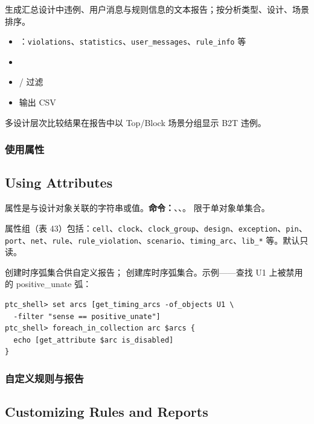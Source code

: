 生成汇总设计中违例、用户消息与规则信息的文本报告；按分析类型、设计、场景排序。

\begin{itemize}
  \item {}：\texttt{violations}、\texttt{statistics}、\texttt{user\_messages}、\texttt{rule\_info} 等
  \item {}
  \item {}/ 过滤
  \item {} 输出 CSV
\end{itemize}

多设计层次比较结果在报告中以 Top/Block 场景分组显示 B2T 违例。

\subsubsection{使用属性}
\subsection*{Using Attributes}

属性是与设计对象关联的字符串或值。\textbf{命令：}、、。 限于单对象单集合。

属性组（表 43）包括：\texttt{cell}、\texttt{clock}、\texttt{clock\_group}、\texttt{design}、\texttt{exception}、\texttt{pin}、\texttt{port}、\texttt{net}、\texttt{rule}、\texttt{rule\_violation}、\texttt{scenario}、\texttt{timing\_arc}、\texttt{lib\_*} 等。默认只读。

 创建时序弧集合供自定义报告； 创建库时序弧集合。示例——查找 U1 上被禁用的 positive\_unate 弧：
\begin{lstlisting}
ptc_shell> set arcs [get_timing_arcs -of_objects U1 \
  -filter "sense == positive_unate"]
ptc_shell> foreach_in_collection arc $arcs {
  echo [get_attribute $arc is_disabled]
}
\end{lstlisting}

\subsubsection{自定义规则与报告}
\subsection*{Customizing Rules and Reports}

